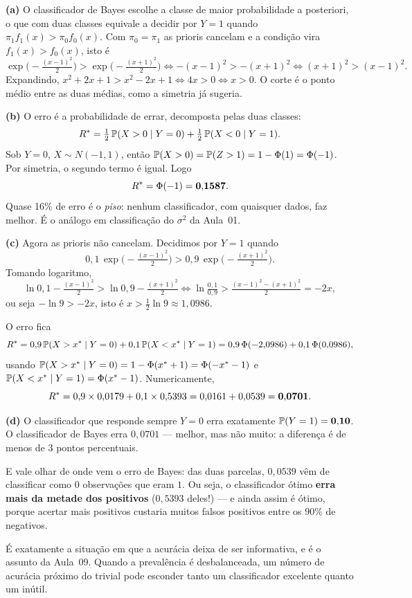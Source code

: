 \documentclass[11pt,a4paper]{article}
\begin{document}
\begin{solucao}
\textbf{(a)} O classificador de Bayes escolhe a classe de maior probabilidade a
posteriori, o que com duas classes equivale a decidir por $Y=1$ quando
$\pi_1 f_1(x) > \pi_0 f_0(x)$. Com $\pi_0=\pi_1$ as prioris cancelam e a condição
vira $f_1(x)>f_0(x)$, isto é
\[
  \exp\Big(-\tfrac{(x-1)^2}{2}\Big) > \exp\Big(-\tfrac{(x+1)^2}{2}\Big)
  \iff -(x-1)^2 > -(x+1)^2
  \iff (x+1)^2 > (x-1)^2 .
\]
Expandindo, $x^2+2x+1 > x^2-2x+1 \iff 4x>0 \iff x>0$. O corte é o ponto médio
entre as duas médias, como a simetria já sugeria.

\smallskip
\textbf{(b)} O erro é a probabilidade de errar, decomposta pelas duas classes:
\[
  R^\ast = \tfrac12\,\mathbb{P}(X>0\mid Y=0) + \tfrac12\,\mathbb{P}(X<0\mid Y=1).
\]
Sob $Y=0$, $X\sim N(-1,1)$, então $\mathbb{P}(X>0)=\mathbb{P}(Z>1)=1-\Phi(1)=\Phi(-1)$. Por
simetria, o segundo termo é igual. Logo
\[
  R^\ast = \Phi(-1) = \mathbf{0{,}1587}.
\]
Quase 16\% de erro é o \emph{piso}: nenhum classificador, com quaisquer dados,
faz melhor. É o análogo em classificação do $\sigma^2$ da Aula~01.

\smallskip
\textbf{(c)} Agora as prioris não cancelam. Decidimos por $Y=1$ quando
\[
  0{,}1\,\exp\Big(-\tfrac{(x-1)^2}{2}\Big) > 0{,}9\,\exp\Big(-\tfrac{(x+1)^2}{2}\Big).
\]
Tomando logaritmo,
\[
  \ln 0{,}1 - \tfrac{(x-1)^2}{2} > \ln 0{,}9 - \tfrac{(x+1)^2}{2}
  \iff \ln\tfrac{0{,}1}{0{,}9} > \tfrac{(x-1)^2-(x+1)^2}{2} = -2x,
\]
ou seja $-\ln 9 > -2x$, isto é $x > \tfrac12\ln 9 \approx 1{,}0986$.

O erro fica
\[
  R^\ast = 0{,}9\,\mathbb{P}(X>x^\ast\mid Y=0) + 0{,}1\,\mathbb{P}(X<x^\ast\mid Y=1)
   = 0{,}9\,\Phi(-2{,}0986) + 0{,}1\,\Phi(0{,}0986),
\]
usando $\mathbb{P}(X>x^\ast\mid Y=0)=1-\Phi(x^\ast+1)=\Phi(-x^\ast-1)$ e
$\mathbb{P}(X<x^\ast\mid Y=1)=\Phi(x^\ast-1)$. Numericamente,
\[
  R^\ast = 0{,}9\times 0{,}0179 + 0{,}1\times 0{,}5393
   = 0{,}0161 + 0{,}0539 = \mathbf{0{,}0701}.
\]

\smallskip
\textbf{(d)} O classificador que responde sempre $Y=0$ erra exatamente
$\mathbb{P}(Y=1)=\mathbf{0{,}10}$. O classificador de Bayes erra $0{,}0701$ --- melhor,
mas não muito: a diferença é de menos de 3 pontos percentuais.

E vale olhar de onde vem o erro de Bayes: das duas parcelas, $0{,}0539$ vêm de
classificar como $0$ observações que eram $1$. Ou seja, o classificador ótimo
\textbf{erra mais da metade dos positivos} ($0{,}5393$ deles!) --- e ainda assim é
ótimo, porque acertar mais positivos custaria muitos falsos positivos entre os
$90\%$ de negativos.

É exatamente a situação em que a acurácia deixa de ser informativa, e é o assunto
da Aula~09. Quando a prevalência é desbalanceada, um número de acurácia próximo
do trivial pode esconder tanto um classificador excelente quanto um inútil.
\end{solucao}
\end{document}
